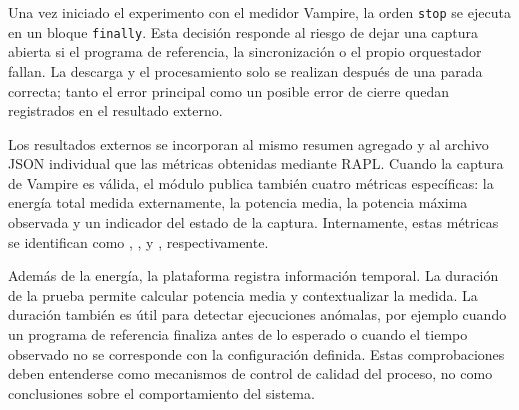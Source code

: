 
Una vez iniciado el experimento con el medidor Vampire, la orden \texttt{stop} se ejecuta en un bloque \texttt{finally}. Esta decisión responde al riesgo de dejar una captura abierta si el programa de referencia, la sincronización o el propio orquestador fallan. La descarga y el procesamiento solo se realizan después de una parada correcta; tanto el error principal como un posible error de cierre quedan registrados en el resultado externo.

Los resultados externos se incorporan al mismo resumen agregado y al archivo JSON individual que las métricas obtenidas mediante RAPL. Cuando la captura de Vampire es válida, el módulo  publica también cuatro métricas específicas: la energía total medida externamente, la potencia media, la potencia máxima observada y un indicador del estado de la captura. Internamente, estas métricas se identifican como , ,  y , respectivamente.

Además de la energía, la plataforma registra información temporal. La duración de la prueba permite calcular potencia media y contextualizar la medida. La duración también es útil para detectar ejecuciones anómalas, por ejemplo cuando un programa de referencia finaliza antes de lo esperado o cuando el tiempo observado no se corresponde con la configuración definida. Estas comprobaciones deben entenderse como mecanismos de control de calidad del proceso, no como conclusiones sobre el comportamiento del sistema.

